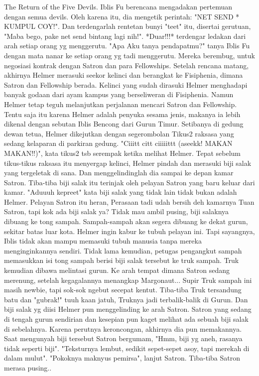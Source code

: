\documentclass[a4paper,11pt,final]{article}
\begin{document}
The Return of the Five Devils.
Iblis Fu berencana mengadakan pertemuan dengan semua devils. Oleh karena itu, dia mengetik perintah: "NET SEND * KUMPUL COY!". Dan terdengarlah rentetan bunyi "teet" itu, disertai gerutuan, "Maba bego, pake net send bintang lagi nih!".
*Duar!!!* terdengar ledakan dari arah setiap orang yg menggerutu. "Apa Aku tanya pendapatmu?" tanya Iblis Fu dengan mata nanar ke setiap orang yg tadi menggerutu.
Mereka berembug, untuk negosiasi kontrak dengan Satron dan para Fellowships. Setelah rencana matang, akhirnya Helmer merasuki seekor kelinci dan berangkat ke Fisiphenia, dimana Satron dan Fellowship berada.
Kelinci yang sudah dirasuki Helmer menghadapi banyak godaan dari ayam kampus yang berseliweran di Fisiphenia. Namun Helmer tetap teguh melanjutkan perjalanan mencari Satron dan Fellowship.
Tentu saja itu karena Helmer adalah penyuka sesama jenis, makanya ia lebih dikenal dengan sebutan Iblis Bencong dari Gurun Timur.
Setibanya di gedung dewan tetua, Helmer dikejutkan dengan segerombolan Tikus2 raksasa yang sedang kelaparan di parkiran gedung. "Ciiitt citt ciiiiittt (aseekk! MAKAN MAKAN!!)", kata tikus2 tsb serempak ketika melihat Helmer.
Tepat sebelum tikus-tikus raksasa itu menyergap kelinci, Helmer pindah dan merasuki biji salak yang tergeletak di sana. Dan menggelindinglah dia sampai ke depan kamar Satron.
Tiba-tiba biji salak itu terinjak oleh pelayan Satron yang baru keluar dari kamar. "Aduuuh kepreet" kata biji salak yang tidak lain tidak bukan adalah Helmer.
Pelayan Satron itu heran, Perasaan tadi udah bersih deh kamarnya Tuan Satron, tapi kok ada biji salak ya? Tidak mau ambil pusing, biji salaknya dibuang ke tong sampah. Sampah-sampah akan segera dibuang ke dekat gurun, sekitar batas luar kota.
Helmer ingin kabur ke tubuh pelayan ini. Tapi sayangnya, Iblis tidak akan mampu memasuki tubuh manusia tanpa mereka menginginkannya sendiri.
Tidak lama kemudian, petugas pengangkut sampah memasukkan isi tong sampah berisi biji salak tersebut ke truk sampah. Truk kemudian dibawa melintasi gurun. Ke arah tempat dimana Satron sedang merenung, setelah kegagalannya menangkap Margonaut...
Supir Truk sampah ini masih newbie, tapi sok-sok ngebut secepat kentut. Tiba-tiba Truk tersandung batu dan "gubrak!" tuuh kaan jatuh, Truknya jadi terbalik-balik di Gurun.
Dan biji salak yg diisi Helmer pun menggelinding ke arah Satron. Satron yang sedang di tengah gurun sendirian dan kesepian pun kaget melihat ada sebuah biji salak di sebelahnya. Karena perutnya keroncongan, akhirnya dia pun memakannya.
Saat mengunyah biji tersebut Satron bergumam, "Hmm, biji yg aneh, rasanya tidak seperti biji". "Teksturnya lembut, sedikit sepet-sepet asoy, tapi merekah di dalam mulut". "Pokoknya maknyus pemirsa", lanjut Satron. Tiba-tiba Satron merasa pusing..
\end{document}
